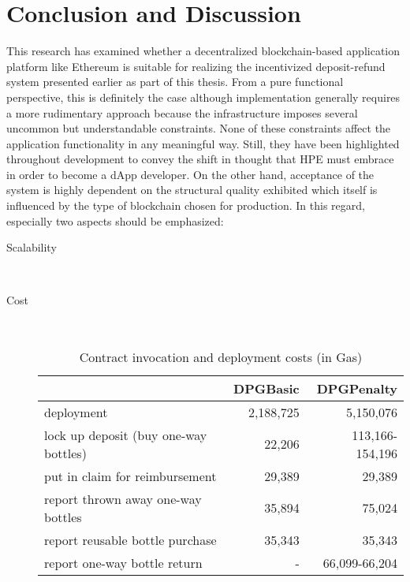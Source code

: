 
\chapter{Conclusion and Discussion}
\label{chp:conclusion}

This research has examined whether a decentralized blockchain-based application platform like Ethereum is suitable for realizing the incentivized deposit-refund system presented earlier as part of this thesis. From a pure functional perspective, this is definitely the case although implementation generally requires a more rudimentary approach because the infrastructure imposes several uncommon but understandable constraints. None of these constraints affect the application functionality in any meaningful way. Still, they have been highlighted throughout development to convey the shift in thought that \ac{HPE} must embrace in order to become a \ac{dApp} developer. On the other hand, acceptance of the system is highly dependent on the structural quality exhibited which itself is influenced by the type of blockchain chosen for production. In this regard, especially two aspects should be emphasized: 

\begin{description}
	\item[Scalability]
	\hfill \\
	

	\item[Cost]
	\hfill \\
	
	\begin{table}[hbt]
	\centering	
	\begin{tabular}{l|r|r}
    	& DPGBasic & DPGPenalty \\
    	\hline
    	deployment & 2,188,725 & 5,150,076 \\
    	\hline
    	lock up deposit (buy one-way bottles) & 22,206 & 113,166-154,196 \\ 
    	put in claim for reimbursement & 29,389 & 29,389 \\
    	report thrown away one-way bottles & 35,894 & 75,024 \\
    	report reusable bottle purchase & 35,343 & 35,343 \\
    	\hline
    	report one-way bottle return & - & 66,099-66,204 \\
	\end{tabular}
	\caption[Contract invocation and deployment costs (in Gas)]{Contract invocation and deployment costs (in Gas) \footnotemark}
	\label{tab:penaltyGas}
	\end{table}
	
	\FloatBarrier

\end{description}
  
